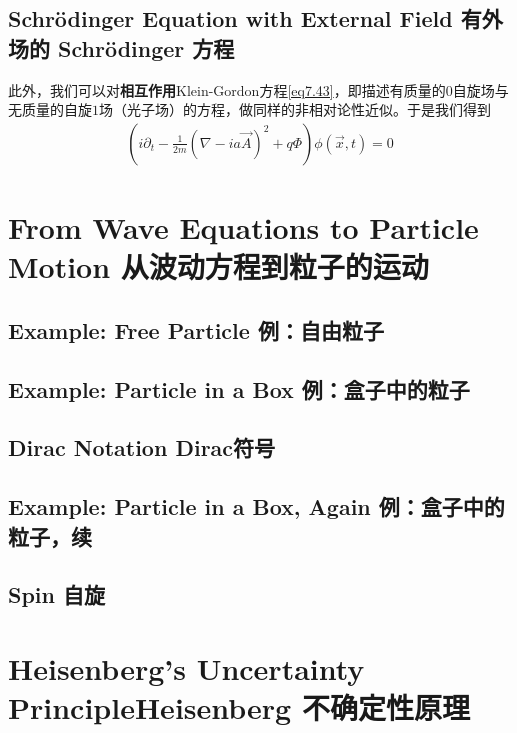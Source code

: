 \subsection[有外场的 Schrödinger 方程]{Schrödinger Equation with External Field 有外场的 Schrödinger 方程}\label{sec8.4.1}

此外，我们可以对{\bf 相互作用}Klein-Gordon方程\eqref{eq7.43}，即描述有质量的$0$自旋场与无质量的自旋$1$场（光子场）的方程，做同样的非相对论性近似。于是我们得到
\begin{align}
\left(i\partial_t-\frac{1}{2m}\left(\nabla-ia\vec{A}\right)^2+q\Phi\right)\phi(\vec{x},t)=0
\end{align}

\section[从波动方程到粒子的运动]{From Wave Equations to Particle Motion 从波动方程到粒子的运动}\label{sec8.5}
\subsection[例：自由粒子]{Example: Free Particle 例：自由粒子}\label{sec8.5.1}
\subsection[例：盒子中的粒子]{Example: Particle in a Box 例：盒子中的粒子}\label{sec8.5.2}
\subsection[Dirac符号]{Dirac Notation Dirac符号}\label{sec8.5.3}
\subsection[例：盒子中的粒子，续]{Example: Particle in a Box, Again 例：盒子中的粒子，续}\label{sec8.5.4}
\subsection[自旋]{Spin 自旋}\label{sec8.5.5}
\section[Heisenberg 不确定性原理]{Heisenberg’s Uncertainty PrincipleHeisenberg 不确定性原理}\label{sec8.6}

